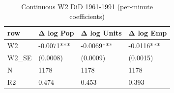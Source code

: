 \begin{table}

\caption{Continuous W2 DiD 1961-1991 (per-minute coefficients)}
\centering
\begin{tabular}[t]{llll}
\toprule
row & Δ log Pop & Δ log Units & Δ log Emp\\
\midrule
W2 & -0.0071*** & -0.0069*** & -0.0116***\\
W2\_SE & (0.0008) & (0.0009) & (0.0015)\\
N & 1178 & 1178 & 1178\\
R2 & 0.474 & 0.453 & 0.393\\
\bottomrule
\end{tabular}
\end{table}

